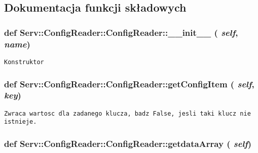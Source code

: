 \subsection{Dokumentacja funkcji składowych}
\hypertarget{class_serv_1_1_config_reader_1_1_config_reader_79fcc0800606aaab1c5b4b0f2910b821}{
\subsubsection[{\_\-\_\-init\_\-\_\-}]{\setlength{\rightskip}{0pt plus 5cm}def Serv::ConfigReader::ConfigReader::\_\-\_\-init\_\-\_\- ( {\em self}, \/   {\em name})}}
\label{class_serv_1_1_config_reader_1_1_config_reader_79fcc0800606aaab1c5b4b0f2910b821}




\footnotesize\begin{verbatim}Konstruktor\end{verbatim}
\normalsize
 \hypertarget{class_serv_1_1_config_reader_1_1_config_reader_9679117d87cde62fd4243670089a11cc}{
\subsubsection[{getConfigItem}]{\setlength{\rightskip}{0pt plus 5cm}def Serv::ConfigReader::ConfigReader::getConfigItem ( {\em self}, \/   {\em key})}}
\label{class_serv_1_1_config_reader_1_1_config_reader_9679117d87cde62fd4243670089a11cc}




\footnotesize\begin{verbatim}Zwraca wartosc dla zadanego klucza, badz False, jesli taki klucz nie istnieje.\end{verbatim}
\normalsize
 \hypertarget{class_serv_1_1_config_reader_1_1_config_reader_6a032fedc46e0b5557d1124aeb5fc996}{
\subsubsection[{getdataArray}]{\setlength{\rightskip}{0pt plus 5cm}def Serv::ConfigReader::ConfigReader::getdataArray ( {\em self})}}
\label{class_serv_1_1_config_reader_1_1_config_reader_6a032fedc46e0b5557d1124aeb5fc996}




